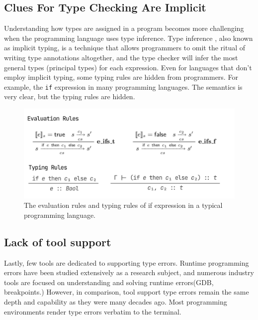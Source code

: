 \subsection{Clues For Type Checking Are Implicit}
Understanding how types are assigned in a program becomes more challenging when the programming language uses type inference.  Type inference \cite{Damas1982-sc},  also known as implicit typing,  is a technique that allows programmers to omit the ritual of writing type annotations altogether, and the type checker will infer the most general types (principal types) for each expression. Even for languages that don't employ implicit typing, some typing rules are hidden from programmers.
For example, the \texttt{if} expression in many programming languages. The semantics is very clear, but the typing rules are hidden.

\begin{figure}[hbt]
  \includegraphics[width=\linewidth]{IfRules.png}
  \caption{
   The evaluation rules and typing rules of if expression in a typical programming language.
    }
\end{figure}


\subsection{Lack of tool support}
Lastly, few tools are dedicated to supporting type errors. Runtime programming errors have been studied extensively as a research subject, and numerous industry tools are focused on understanding and solving runtime errors(GDB, breakpoints.) However, in comparison, tool support type errors remain the same depth and capability as they were many decades ago. Most programming environments render type errors verbatim to the terminal.   


